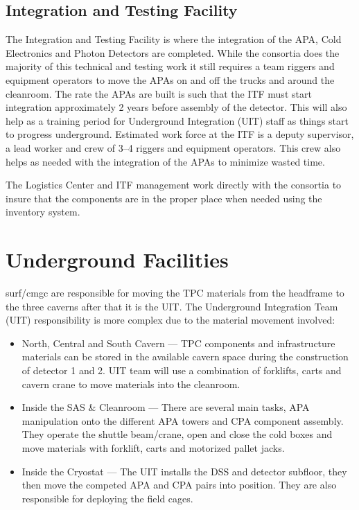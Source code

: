 \subsection{Integration and Testing Facility}

The Integration and Testing Facility is where the integration of the
APA, Cold Electronics and Photon Detectors are completed. While the
consortia does the majority of this technical and testing work it
still requires a team riggers and equipment operators to move the APAs
on and off the trucks and around the cleanroom.  The rate the APAs are
built is such that the ITF must start integration approximately 2
years before assembly of the detector.  This will also help as a
training period for Underground Integration (UIT) staff as things
start to progress underground.  Estimated work force at the ITF is a
deputy supervisor, a lead worker and crew of 3--4 riggers and equipment
operators.  This crew also helps as needed with the integration of the
APAs to minimize wasted time.

The Logistics Center and ITF management work directly with the
consortia to insure that the components are in the proper place when
needed using the inventory system.
  

\section{Underground Facilities}

{surf}/{cmgc} are responsible for moving the TPC materials from the
headframe to the three caverns after that it is the UIT. The
Underground Integration Team (UIT) responsibility is more complex due
to the material movement involved:
\begin{itemize}
 \item North, Central and South Cavern --- TPC components and
   infrastructure materials can be stored in the available cavern
   space during the construction of detector 1 and 2.  UIT team will
   use a combination of forklifts, carts and cavern crane to move
   materials into the cleanroom.
 \item Inside the SAS \& Cleanroom --- There are several main tasks, APA
   manipulation onto the different APA towers and CPA component
   assembly.  They operate the shuttle beam/crane, open and close the
   cold boxes and move materials with forklift, carts and motorized
   pallet jacks.
 \item Inside the Cryostat --- The UIT installs the DSS and detector
   subfloor, they then move the competed APA and CPA pairs into
   position.  They are also responsible for deploying the field cages.
\end{itemize}

